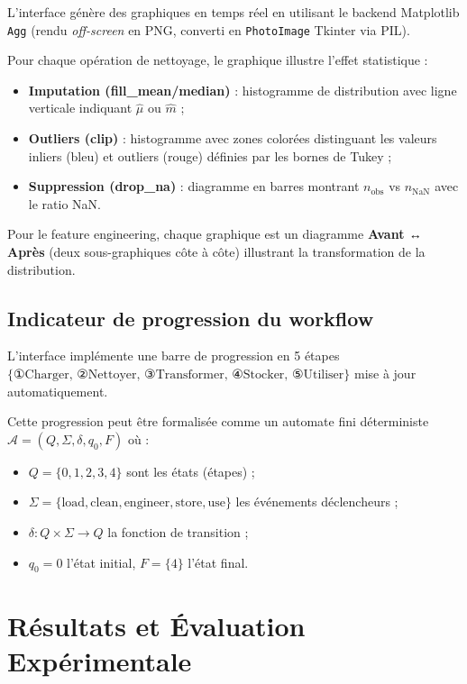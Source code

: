 \documentclass[12pt,a4paper]{article}
\begin{document}
L'interface génère des graphiques en temps réel en utilisant le backend
Matplotlib \texttt{Agg} (rendu \textit{off-screen} en PNG, converti en
\texttt{PhotoImage} Tkinter via PIL).

Pour chaque opération de nettoyage, le graphique illustre l'effet statistique :

\begin{itemize}
  \item \textbf{Imputation (fill\_mean/median)} : histogramme de distribution
    avec ligne verticale indiquant $\hat{\mu}$ ou $\hat{m}$ ;
  \item \textbf{Outliers (clip)} : histogramme avec zones colorées distinguant
    les valeurs inliers (bleu) et outliers (rouge) définies par les bornes de Tukey ;
  \item \textbf{Suppression (drop\_na)} : diagramme en barres montrant
    $n_{\text{obs}}$ vs $n_{\text{NaN}}$ avec le ratio NaN.
\end{itemize}

Pour le feature engineering, chaque graphique est un diagramme \textbf{Avant ↔ Après}
(deux sous-graphiques côte à côte) illustrant la transformation de la distribution.

\subsection{Indicateur de progression du workflow}

L'interface implémente une barre de progression en 5 étapes
$\{①\text{Charger},\, ②\text{Nettoyer},\, ③\text{Transformer},\,
④\text{Stocker},\, ⑤\text{Utiliser}\}$ mise à jour automatiquement.

Cette progression peut être formalisée comme un automate fini déterministe
$\mathcal{A} = (Q, \Sigma, \delta, q_0, F)$ où :
\begin{itemize}
  \item $Q = \{0, 1, 2, 3, 4\}$ sont les états (étapes) ;
  \item $\Sigma = \{\text{load}, \text{clean}, \text{engineer}, \text{store},
    \text{use}\}$ les événements déclencheurs ;
  \item $\delta : Q \times \Sigma \to Q$ la fonction de transition ;
  \item $q_0 = 0$ l'état initial, $F = \{4\}$ l'état final.
\end{itemize}

\section{Résultats et Évaluation Expérimentale}
\end{document}
